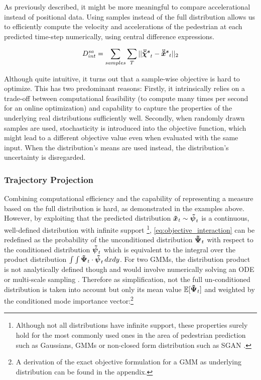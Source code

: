 As previously described, it might be more meaningful to compare accelerational instead of positional data. Using samples instead of the full distribution allows us to efficiently compute the velocity and accelerations of the pedestrian at each predicted time-step numerically, using central difference expressions. 

\begin{equation}
D_{int}^{sa} = \sum_{samples} \sum_T ||\ddxpedwo[s]_t - \ddxped[s]_t||_2
\end{equation}

Although quite intuitive, it turns out that a sample-wise objective is hard to optimize. This has two predominant reasons: Firstly, it intrinsically relies on a trade-off between computational feasibility (to compute many times per second for an online optimization) and capability to capture the properties of the underlying real distributions sufficiently well. Secondly, when randomly drawn samples are used, stochasticity is introduced into the objective function, which might lead to a different objective value even when evaluated with the same input. When the distribution's means are used instead, the distribution's uncertainty is disregarded. 

\subsubsection{Trajectory Projection}
Combining computational efficiency and the capability of representing a measure based on the full distribution is hard, as demonstrated in the examples above. However, by exploiting that the predicted distribution $\xped[]_t \sim \dist[]_t$ is a continuous, well-defined distribution with infinite support \footnote{Although not all distributions have infinite support, these properties surely hold for the most commonly used ones in the area of pedestrian prediction such as Gaussians, \ac{GMM}s \cite{Salzmann2020} or non-closed form distribution such as SGAN \cite{Gupta2018}.}, \ref{eq:objective_interaction} can be redefined as the probability of the unconditioned distribution $\distwo[]_t$ with respect to the conditioned distribution $\dist[]_t$ which is equivalent to the integral over the product distribution $\int \int \distwo[]_t \cdot \dist[]_t \, dxdy$.
\newline
For two \ac{GMM}s, the distribution product is not analytically defined though and would involve numerically solving an \ac{ODE} \cite{Schrempf2005} or multi-scale sampling \cite{Ihler2003}. Therefore as simplification, not the full un-conditioned distribution is taken into account but only its mean value $\mathbb{E}[\distwo[]_t]$ and weighted by the conditioned mode importance vector:\footnote{A derivation of the exact objective formulation for a \ac{GMM} as underlying distribution can be found in the appendix.}

